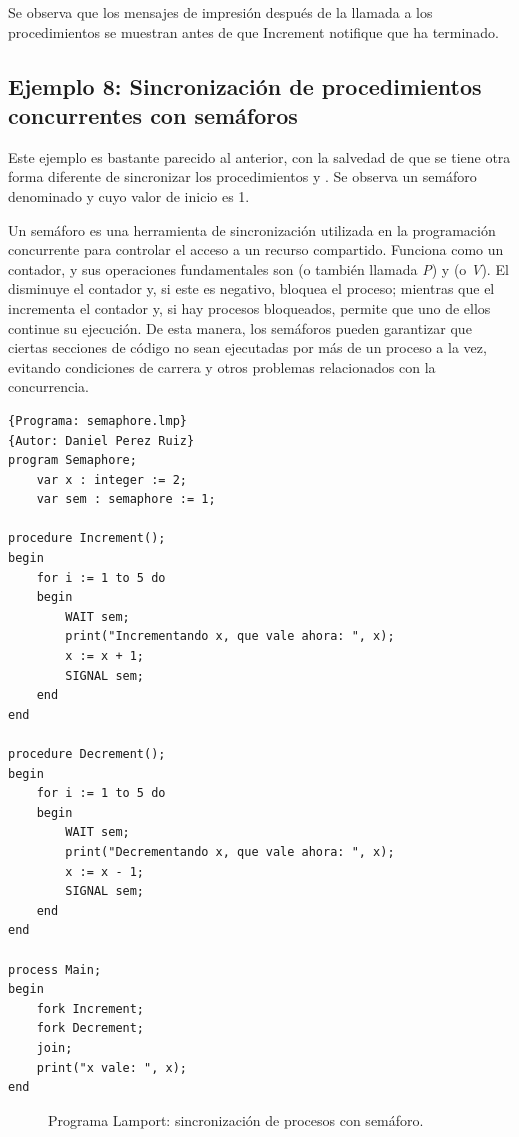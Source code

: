 Se observa que los mensajes de impresión después de la llamada a los procedimientos se muestran antes de que Increment notifique que ha terminado.

\newpage
\subsection{Ejemplo 8: Sincronización de procedimientos concurrentes con semáforos}
Este ejemplo es bastante parecido al anterior, con la salvedad de que se tiene otra forma diferente de sincronizar los procedimientos  y . Se observa un semáforo denominado  y cuyo valor de inicio es 1.

\vspace{0.5cm}

Un semáforo es una herramienta de sincronización utilizada en la programación concurrente para controlar el acceso a un recurso compartido. Funciona como un contador, y sus operaciones fundamentales son  (o también llamada \textit{P}) y  (o \textit{V}). El  disminuye el contador y, si este es negativo, bloquea el proceso; mientras que el  incrementa el contador y, si hay procesos bloqueados, permite que uno de ellos continue su ejecución. De esta manera, los semáforos pueden garantizar que ciertas secciones de código no sean ejecutadas por más de un proceso a la vez, evitando condiciones de carrera y otros problemas relacionados con la concurrencia.

\begin{lstlisting}[style=lamportStyle]
{Programa: semaphore.lmp}
{Autor: Daniel Perez Ruiz}
program Semaphore;
    var x : integer := 2;
    var sem : semaphore := 1;

procedure Increment();
begin
    for i := 1 to 5 do
    begin
        WAIT sem;
        print("Incrementando x, que vale ahora: ", x);
        x := x + 1;
        SIGNAL sem;
    end
end

procedure Decrement();
begin
    for i := 1 to 5 do
    begin
        WAIT sem;
        print("Decrementando x, que vale ahora: ", x);
        x := x - 1;
        SIGNAL sem;
    end
end

process Main;
begin
    fork Increment;
    fork Decrement;
    join;
    print("x vale: ", x);
end
\end{lstlisting}
\begin{figure}[h]
\caption{Programa Lamport: sincronización de procesos con semáforo.}
\label{fig:lamportSemaphore}
\end{figure}

